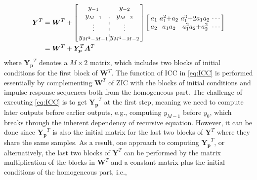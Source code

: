 \begin{equation}
    \label{eq:ICC}
    \begin{aligned}
        \bm{Y}^T &= \bm{W}^T + \left[\arraycolsep=1.0pt\def\arraystretch{1.0}
                \begin{array}{c:c}
                y_{-1} & y_{-2} \\ 
                y_{M-1} & y_{M-2} \\
                \vdots & \vdots \\
                y_{M^2-M-1} & y_{M^2-M-2}
                \end{array}\right]  
                \left[\arraycolsep=1.6pt\def\arraystretch{1.0}
                    \begin{array}{cccc}
                    a_1 & a_1^2{+}a_2 & a_1^3{+}2a_1a_2 & \cdots \\ 
                    a_2 & a_1a_2 & a_1^2a_2{+}a_2^2 & \cdots \\
                    \end{array}\right] \\
        & = \bm{W}^T + \bm{Y_p}^T  \bm{A}^T
    \end{aligned}
\end{equation}
where $\bm{Y_p}^T$ denotes a $M \times 2$ matrix, which includes two blocks of initial conditions for the first block of $\bm{W}^T$.
The function of ICC in \eqref{eq:ICC} is performed essentially by complementing 
$\bm{W}^T$ of ZIC with the blocks of initial conditions and impulse response sequences both from the homogeneous part.
The challenge of executing \eqref{eq:ICC} is to get $\bm{Y_p}^T$ at the first step,
meaning we need to compute later outputs before earlier outputs,
e.g., computing $y_{M-1}$ before $y_0$, which breaks through the inherent dependency of recursive equation.
However, it can be done since $\bm{Y_p}^T$ is also the initial matrix 
for the last two blocks of $\bm{Y}^T$ where they share the same samples.
As a result, one approach to computing $\bm{Y_p}^T$, or alternatively, the last two blocks of $\bm{Y}^T$
can be performed by the matrix multiplication of the blocks in
$\bm{W}^T$ and a constant matrix plus the initial conditions of the homogeneous part, i.e.,

